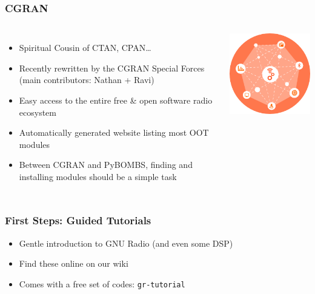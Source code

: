 \documentclass{beamer}
\begin{document}
\begin{frame}
  \frametitle{CGRAN}

  \begin{columns}[c]
    \column[T]{9cm}

  \begin{itemize}
    \item Spiritual Cousin of CTAN, CPAN\ldots
    \item Recently rewritten by the CGRAN Special Forces (main contributors: Nathan + Ravi)
    \item Easy access to the entire free \& open software radio ecosystem
    \item Automatically generated website listing most OOT modules
    \item Between CGRAN and PyBOMBS, finding and installing modules should be a simple task
  \end{itemize}

    \column[T]{2cm}

  \includegraphics[width=\textwidth]{cgran_logo}

  \end{columns}

\end{frame}

\begin{frame}
  \frametitle{First Steps: Guided Tutorials}
  \begin{itemize}
    \item Gentle introduction to GNU Radio (and even some DSP)
    \item Find these online on our wiki
    \item Comes with a free set of codes: \texttt{gr-tutorial}
  \end{itemize}
\end{frame}
\end{document}
